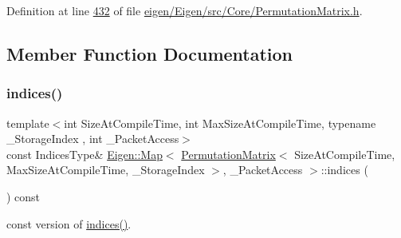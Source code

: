 Definition at line \hyperlink{eigen_2_eigen_2src_2_core_2_permutation_matrix_8h_source_l00432}{432} of file \hyperlink{eigen_2_eigen_2src_2_core_2_permutation_matrix_8h_source}{eigen/\+Eigen/src/\+Core/\+Permutation\+Matrix.\+h}.



\subsection{Member Function Documentation}
\mbox{\label{class_eigen_1_1_map_3_01_permutation_matrix_3_01_size_at_compile_time_00_01_max_size_at_compile_2f9d18bf0084dbfb13fbbfe14adaf22d_a3f1607f68044608f11a256ba62c2e923}} 
\subsubsection{\texorpdfstring{indices()}{indices()}\hspace{0.1cm}{\footnotesize\ttfamily [1/4]}}
{\footnotesize\ttfamily template$<$int Size\+At\+Compile\+Time, int Max\+Size\+At\+Compile\+Time, typename \+\_\+\+Storage\+Index , int \+\_\+\+Packet\+Access$>$ \\
const Indices\+Type\& \hyperlink{group___core___module_class_eigen_1_1_map}{Eigen\+::\+Map}$<$ \hyperlink{group___core___module_class_eigen_1_1_permutation_matrix}{Permutation\+Matrix}$<$ Size\+At\+Compile\+Time, Max\+Size\+At\+Compile\+Time, \+\_\+\+Storage\+Index $>$, \+\_\+\+Packet\+Access $>$\+::indices (\begin{DoxyParamCaption}{ }\end{DoxyParamCaption}) const\hspace{0.3cm}{\ttfamily [inline]}}

const version of \hyperlink{class_eigen_1_1_map_3_01_permutation_matrix_3_01_size_at_compile_time_00_01_max_size_at_compile_2f9d18bf0084dbfb13fbbfe14adaf22d_af9771ec7bda9dfc5c5a6cc9857410c4c}{indices()}. 

